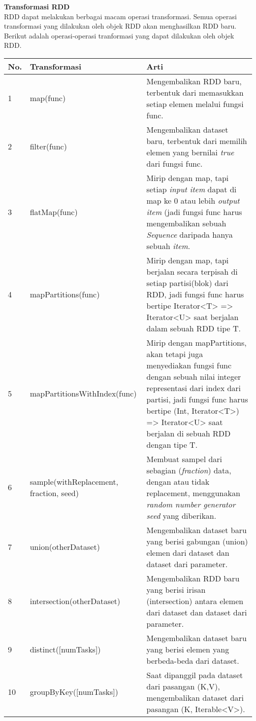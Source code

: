 \documentclass[a4paper,twoside]{article}
\begin{document}
\begin{enumerate}
\textbf{Transformasi RDD}\\
RDD dapat melakukan berbagai macam operasi transformasi. Semua operasi transformasi yang dilakukan oleh objek RDD akan menghasilkan RDD baru. Berikut adalah operasi-operasi tranformasi yang dapat dilakukan oleh objek RDD.\\
\begin{tabular}{|p{}|p{}|p{}|}
\hline 
No. & Transformasi & Arti \\ 
\hline 
1 & map(func) & Mengembalikan RDD baru, terbentuk dari memasukkan setiap elemen melalui fungsi func. \\ 
\hline 
2 & filter(func) & Mengembalikan dataset baru, terbentuk dari memilih elemen yang bernilai \textit{true} dari fungsi func.\\ 
\hline 
3 & flatMap(func) & Mirip dengan map, tapi setiap \textit{input item} dapat di map ke 0 atau lebih \textit{output item} (jadi fungsi func harus mengembalikan sebuah \textit{Sequence} daripada hanya sebuah \textit{item}.\\ 
\hline 
4 & mapPartitions(func) & Mirip dengan map, tapi berjalan secara terpisah di setiap partisi(blok) dari RDD, jadi fungsi func harus bertipe Iterator<T> => Iterator<U> saat berjalan dalam sebuah RDD tipe T.\\ 
\hline 
5 & mapPartitionsWithIndex(func) & Mirip dengan mapPartitions, akan tetapi juga menyediakan fungsi func dengan sebuah nilai integer representasi dari index dari partisi, jadi fungsi func harus bertipe (Int, Iterator<T>) => Iterator<U> saat berjalan di sebuah RDD dengan tipe T. \\ 
\hline 
6 & sample(withReplacement, fraction, seed) & Membuat sampel dari sebagian (\textit{fraction}) data, dengan atau tidak replacement, menggunakan \textit{random number generator seed} yang diberikan.\\ 
\hline 
7 & union(otherDataset) & Mengembalikan dataset baru yang berisi gabungan (union) elemen dari dataset dan dataset dari parameter.\\ 
\hline 
8 & intersection(otherDataset) & Mengembalikan RDD baru yang berisi irisan (intersection) antara elemen dari dataset dan dataset dari parameter.\\ 
\hline
9 & distinct([numTasks]) & Mengembalikan dataset baru yang berisi elemen yang berbeda-beda dari dataset.\\ 
\hline 
10 & groupByKey([numTasks]) & Saat dipanggil pada dataset dari pasangan (K,V), mengembalikan dataset dari pasangan (K, Iterable<V>). \\ 

\end{tabular}
\end{enumerate}
\end{document}
